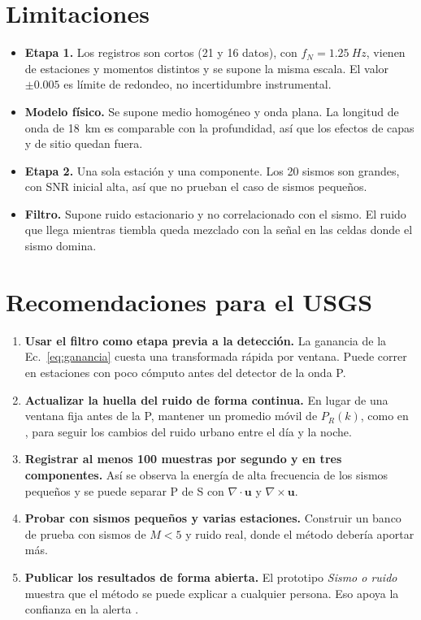 \documentclass[11pt,letterpaper]{article}
\begin{document}
\section{Limitaciones}
\begin{itemize}
\item \textbf{Etapa 1.} Los registros son cortos (21 y 16 datos), con $f_N = \SI{1.25}{Hz}$, vienen de estaciones y momentos distintos y se supone la misma escala. El valor $\pm 0.005$ es límite de redondeo, no incertidumbre instrumental.
\item \textbf{Modelo físico.} Se supone medio homogéneo y onda plana. La longitud de onda de \SI{18}{km} es comparable con la profundidad, así que los efectos de capas y de sitio quedan fuera.
\item \textbf{Etapa 2.} Una sola estación y una componente. Los 20 sismos son grandes, con SNR inicial alta, así que no prueban el caso de sismos pequeños.
\item \textbf{Filtro.} Supone ruido estacionario y no correlacionado con el sismo. El ruido que llega mientras tiembla queda mezclado con la señal en las celdas donde el sismo domina.
\end{itemize}

\section{Recomendaciones para el USGS}
\begin{enumerate}
\item \textbf{Usar el filtro como etapa previa a la detección.} La ganancia de la Ec.~\eqref{eq:ganancia} cuesta una transformada rápida por ventana. Puede correr en estaciones con poco cómputo antes del detector de la onda P.
\item \textbf{Actualizar la huella del ruido de forma continua.} En lugar de una ventana fija antes de la P, mantener un promedio móvil de $P_R(k)$, como en \textcite{mousavi2016}, para seguir los cambios del ruido urbano entre el día y la noche.
\item \textbf{Registrar al menos 100 muestras por segundo y en tres componentes.} Así se observa la energía de alta frecuencia de los sismos pequeños y se puede separar P de S con $\nabla\cdot\mathbf u$ y $\nabla\times\mathbf u$.
\item \textbf{Probar con sismos pequeños y varias estaciones.} Construir un banco de prueba con sismos de $M < 5$ y ruido real, donde el método debería aportar más.
\item \textbf{Publicar los resultados de forma abierta.} El prototipo \textit{Sismo o ruido} muestra que el método se puede explicar a cualquier persona. Eso apoya la confianza en la alerta \parencite{allen2018eos}.
\end{enumerate}
\end{document}
